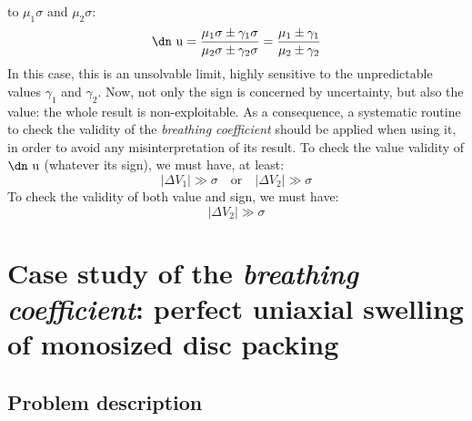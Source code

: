 \documentclass[11pt]{article}
\newcommand{\brco}{\textit{breathing coefficient}\xspace}
\newcommand{\DV}[1]{\Delta V_{#1}}
\newcommand{\udan}{\text{\dn u}}
\begin{document}
to $\mu_1\sigma$ and $\mu_2\sigma$:
\begin{equation}
	\udan
	= \frac{\mu_1\sigma \pm \gamma_1\sigma}{\mu_2\sigma \pm \gamma_2\sigma}
	= \frac{\mu_1 \pm \gamma_1}{\mu_2 \pm \gamma_2}
\end{equation}
In this case, this is an unsolvable limit, highly sensitive to the 
unpredictable values $\gamma_1$ and $\gamma_2$. Now, not only the sign is
concerned by uncertainty, but also the value: the whole result is
non-exploitable. As a consequence, a systematic routine to check the validity of
the \brco should be applied when using it, in order to avoid any
misinterpretation of its result. To check the value validity of $\udan$
(whatever its sign), we must have, at least:
\begin{equation}
	|\DV{1}| \gg \sigma
	\quad \text{or} \quad
	|\DV{2}| \gg \sigma
\end{equation}
To check the validity of both value and sign, we must have:
\begin{equation}
	|\DV{2}| \gg \sigma
\end{equation}


\section{Case study of the \brco:
	perfect uniaxial swelling of monosized disc packing}
\label{sec:case-study-of-breathing-coefficient}

\subsection{Problem description}
\end{document}
